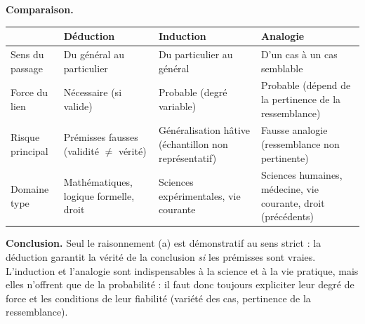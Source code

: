\documentclass[11pt]{article}
\begin{document}
\begin{exoresolu}
\textbf{Comparaison.}
\begin{center}
\begin{tabularx}{\linewidth}{|l|X|X|X|}
\hline
\rowcolor{popblueL} & \textbf{Déduction} & \textbf{Induction} & \textbf{Analogie} \\
\hline
Sens du passage & Du général au particulier & Du particulier au général & D'un cas à un cas semblable \\
\hline
Force du lien & Nécessaire (si valide) & Probable (degré variable) & Probable (dépend de la pertinence de la ressemblance) \\
\hline
Risque principal & Prémisses fausses (validité $\neq$ vérité) & Généralisation hâtive (échantillon non représentatif) & Fausse analogie (ressemblance non pertinente) \\
\hline
Domaine type & Mathématiques, logique formelle, droit & Sciences expérimentales, vie courante & Sciences humaines, médecine, vie courante, droit (précédents) \\
\hline
\end{tabularx}
\end{center}

\textbf{Conclusion.} Seul le raisonnement (a) est démonstratif au sens strict : la déduction garantit la vérité de la conclusion \emph{si} les prémisses sont vraies. L'induction et l'analogie sont indispensables à la science et à la vie pratique, mais elles n'offrent que de la probabilité : il faut donc toujours expliciter leur degré de force et les conditions de leur fiabilité (variété des cas, pertinence de la ressemblance).
\end{exoresolu}
\end{document}
